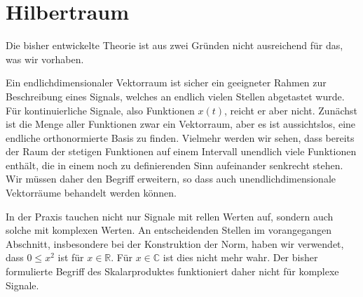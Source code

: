 %
%
%
\section{Hilbertraum
\label{section:hilbertraum}}
Die bisher entwickelte Theorie ist aus zwei Gründen nicht ausreichend für das,
was wir vorhaben.

Ein endlichdimensionaler Vektorraum ist sicher ein geeigneter Rahmen zur
Beschreibung eines Signals, welches an endlich vielen Stellen abgetastet
wurde.
Für kontinuierliche Signale, also Funktionen $x(t)$,  reicht er aber nicht.
Zunächst ist die Menge aller Funktionen zwar ein Vektorraum, aber es ist
aussichtslos, eine endliche orthonormierte Basis zu finden.
Vielmehr werden wir sehen, dass bereits der Raum der stetigen Funktionen
auf einem Intervall unendlich viele Funktionen enthält, die in einem noch
zu definierenden Sinn aufeinander senkrecht stehen.
Wir müssen daher den Begriff erweitern, so dass auch unendlichdimensionale
Vektorräume behandelt werden können.

In der Praxis tauchen nicht nur Signale mit rellen Werten auf, sondern
auch solche mit komplexen Werten.
An entscheidenden Stellen im vorangegangen Abschnitt, insbesondere bei
der Konstruktion der Norm, haben wir verwendet,
dass $0 \le x^2$ ist für $x\in\mathbb R$. Für $x\in\mathbb C$ ist dies
nicht mehr wahr.
Der bisher formulierte Begriff des Skalarproduktes funktioniert daher
nicht für komplexe Signale.


